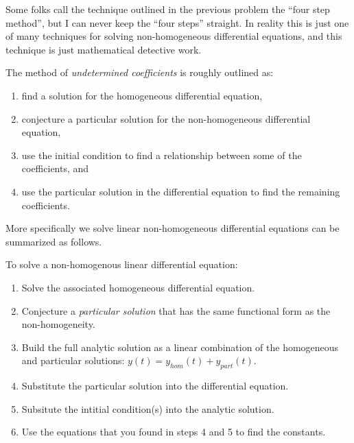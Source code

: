 Some folks call the technique outlined in the previous problem the ``four step method'',
but I can never keep the ``four steps'' straight.  In reality this is just one
of many techniques for solving non-homogeneous differential equations, and this technique
is just mathematical detective work.
\begin{technique}
    The method of {\it undetermined coefficients} is roughly outlined as:
    \begin{enumerate}
        \item find a solution for the homogeneous differential equation,
        \item conjecture a particular solution for the non-homogeneous differential equation, 
        \item use the initial condition to find a relationship between some of the
            coefficients, and
        \item use the particular solution in the differential equation to find the
            remaining coefficients.
    \end{enumerate}
\end{technique}


More specifically we solve linear non-homogeneous differential equations can be summarized
as follows.
\begin{technique}
    To solve a non-homogenous linear differential equation:
    \begin{enumerate}
        \item Solve the associated homogeneous differential equation.
        \item Conjecture a {\it particular solution} that has the same functional form as
            the non-homogeneity.
        \item Build the full analytic solution as a linear combination of the homogeneous and
            particular solutions: $y(t) = y_{hom}(t) + y_{part}(t)$.
        \item Substitute the particular solution into the differential equation.
        \item Subsitute the intitial condition(s) into the analytic solution.
        \item Use the equations that you found in steps 4 and 5 to find the constants.
    \end{enumerate}
\end{technique}

